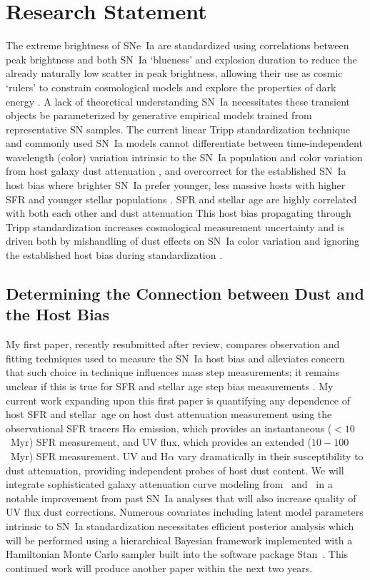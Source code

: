 \documentclass[modern]{aastex63}
\begin{document}
\section{Research Statement}
The extreme brightness of SNe~Ia are standardized using correlations between peak brightness and both SN~Ia `blueness' and explosion duration to reduce the already naturally low scatter in peak brightness, allowing their use as cosmic `rulers' to constrain cosmological models and explore the properties of dark energy \citep{Perlmutter1999}.
A lack of theoretical understanding SN~Ia necessitates these transient objects be parameterized by generative empirical models trained from representative SN samples.
The current linear Tripp standardization technique and commonly used SN~Ia models cannot differentiate between time-independent wavelength (color) variation intrinsic to the SN~Ia population and color variation from host galaxy dust attenuation \citep{Mandel2017}, and overcorrect for the established SN~Ia host bias where brighter SN~Ia prefer younger, less massive hosts with higher SFR and younger stellar populations \citep{Sullivan2010,Rigault2018}.
SFR and stellar age are highly correlated with both each other and dust attenuation
This host bias propagating through Tripp standardization increases cosmological measurement uncertainty and is driven both by mishandling of dust effects on SN~Ia color variation and ignoring the established host bias during standardization \citep{Brout2021,Rose2021}.

\subsection{Determining the Connection between Dust and the Host Bias}
My first paper, recently resubmitted after review, compares observation and fitting techniques used to measure the SN~Ia host bias and alleviates concern that such choice in technique influences mass step measurements; it remains unclear if this is true for SFR and stellar age step bias measurements \citep{Hand2021}.  My current work expanding upon this first paper is quantifying any dependence of host SFR and stellar~age on host dust attenuation measurement using the observational SFR tracers H$\alpha$ emission, which provides an instantaneous ($<10$~Myr) SFR measurement, and UV flux, which provides an extended ($10-100$~Myr) SFR measurement.
UV and H$\alpha$ vary dramatically in their susceptibility to dust attenuation, providing independent probes of host dust content.
We will integrate sophisticated galaxy attenuation curve modeling from~\cite{Salim2018} and~\cite{Narayanan2018} in a notable improvement from past SN~Ia analyses that will also increase quality of UV flux dust corrections.
Numerous covariates including latent model parameters intrinsic to SN~Ia standardization necessitates efficient posterior analysis which will be performed using a hierarchical Bayesian framework implemented with a Hamiltonian Monte Carlo sampler built into the software package Stan~\citep{STAN}.  This continued work will produce another paper within the next two years.
\end{document}
